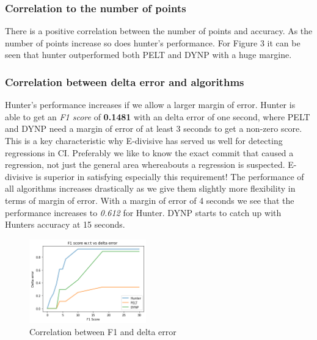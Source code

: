 \documentclass[sigconf]{acmart}
\begin{document}
\subsubsection{Correlation to the number of points}

There is a positive correlation between the number of points and accuracy. As the number of points increase so does hunter's performance. For Figure 3 it can be seen that hunter outperformed both PELT and DYNP with a huge margine.

\subsubsection{Correlation between delta error and algorithms}
Hunter's performance increases if we allow a larger margin of error. Hunter is able to get an \textit{F1 score} of \textbf{0.1481} with an delta error of one second, where PELT and DYNP need a margin of error of at least 3 seconds to get a non-zero score. This is a key characteristic why E-divisive has served us well for detecting regressions in CI. Preferably we like to know the exact commit that caused a regression, not just the general area whereabouts a regression is suspected. E-divisive is superior in satisfying especially this requirement! The performance of all algorithms increases drastically as we give them slightly more flexibility in terms of margin of error. With a margin of error of 4 seconds we see that the performance increases to \textit{0.612} for Hunter. DYNP starts to catch up with Hunters accuracy at 15 seconds.

\begin{figure}[H]
	\includegraphics[width=0.45\textwidth]{line-graph.png}
	\caption{Correlation between F1 and delta error }
\end{figure}
\end{document}
